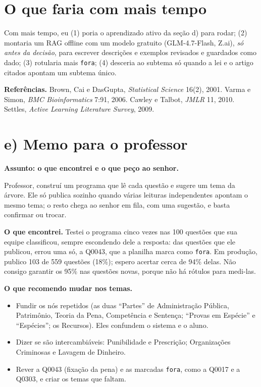 \documentclass[12pt]{article}
\newcommand{\cod}[1]{\texttt{\small #1}}
\begin{document}
\section*{O que faria com mais tempo}
Com mais tempo, eu (1) poria o aprendizado ativo da seção d) para rodar; (2) montaria um RAG offline com um modelo gratuito (GLM-4.7-Flash, Z.ai), \emph{só antes da decisão}, para escrever descrições e exemplos revisados e guardados como dado; (3) rotularia mais \cod{fora}; (4) desceria ao subtema só quando a lei e o artigo citados apontam um subtema único.

{\scriptsize\textbf{Referências.} Brown, Cai e DasGupta, \emph{Statistical Science} 16(2), 2001. Varma e Simon, \emph{BMC Bioinformatics} 7:91, 2006. Cawley e Talbot, \emph{JMLR} 11, 2010. Settles, \emph{Active Learning Literature Survey}, 2009.}

\newpage
\section*{e) Memo para o professor}
\textbf{Assunto: o que encontrei e o que peço ao senhor.}

Professor, construí um programa que lê cada questão e sugere um tema da árvore. Ele só publica sozinho quando várias leituras independentes apontam o mesmo tema; o resto chega ao senhor em fila, com uma sugestão, e basta confirmar ou trocar.

\textbf{O que encontrei.} Testei o programa cinco vezes nas 100 questões que sua equipe classificou, sempre escondendo dele a resposta: das questões que ele publicou, errou uma só, a Q0043, que a planilha marca como \cod{fora}. Em produção, publico 103 de 559 questões (18\%); espero acertar cerca de 94\% delas. Não consigo garantir os 95\% nas questões novas, porque não há rótulos para medi-las.

\textbf{O que recomendo mudar nos temas.}
\begin{itemize}
\item Fundir os nós repetidos (as duas ``Partes'' de Administração Pública, Patrimônio, Teoria da Pena, Competência e Sentença; ``Provas em Espécie'' e ``Espécies''; os Recursos). Eles confundem o sistema e o aluno.
\item Dizer se são intercambiáveis: Punibilidade e Prescrição; Organizações Criminosas e Lavagem de Dinheiro.
\item Rever a Q0043 (fixação da pena) e as marcadas \cod{fora}, como a Q0017 e a Q0303, e criar os temas que faltam.
\end{itemize}
\end{document}
